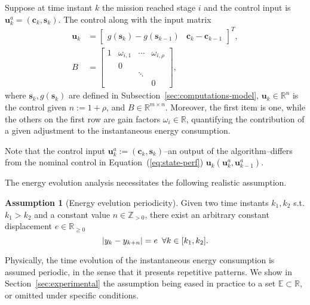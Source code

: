 \documentclass[letterpaper,10pt,conference]{ieeeconf}
\DeclarePairedDelimiter\abs{\lvert}{\rvert}%
\theoremstyle{definition}
\newtheorem{assm}[thm]{Assumption}
\begin{document}
Suppose at time instant $k$ the mission reached stage $i$ and the control input is $\mathbf{u}_k^a=(\mathbf{c}_k,\mathbf{s}_k)$. The control along with the input matrix
\begin{equation}\label{eq:state-control}\begin{split}  
  \mathbf{u}_k&=\begin{bmatrix}g(\mathbf{s}_k)-g(\mathbf{s}_{k-1}) & \mathbf{c}_k-\mathbf{c}_{k-1}\end{bmatrix}^T,\\
  B&=\left[\begin{array}{cccc}
    1& \omega_{i,1}& \cdots& \omega_{i,\rho}  \\
     &            0&       &  \\
     &             & \ddots&  \\
     &             &       & 0
  \end{array}\right],
\end{split}\end{equation}
where $\mathbf{s}_k,g(\mathbf{s}_k)$ are defined in Subsection~\ref{sec:computations-model}, $\mathbf{u}_k\in\mathbb{R}^n$ is the control given $n:=1+\rho$, and $B\in\mathbb{R}^{m\times n}$. Moreover, the first item is one, while the others on the first row are gain factors $\omega_{i}\in\mathbb{R}$, quantifying the contribution of a given adjustment to the instantaneous energy consumption. 

Note that the control input $\mathbf{u}_k^a:=(\mathbf{c}_{k},\mathbf{s}_{k})$--an output of the algorithm--differs from the nominal control in Equation~(\ref{eq:state-perf}) $\mathbf{u}_k(\mathbf{u}_k^a,\mathbf{u}_{k-1}^a)$.

The energy evolution analysis necessitates the following realistic assumption.
\begin{assm}[Energy evelution periodicity]\label{assm:periodic} 
Given two time instants $k_1,k_2$ s.t. $k_1>k_2$ and a constant value $n\in\mathbb{Z}_{> 0}$, there exist an arbitrary constant displacement $e\in\mathbb{R}_{\geq 0}$
\begin{equation}
  \abs{y_{k}-y_{k+n}}= e\,\,\,\forall k\in[k_1,k_2].
\end{equation}
\end{assm}

Physically, the time evolution of the instantaneous energy consumption is assumed periodic, in the sense that it presents repetitive patterns. We show in Section~\ref{sec:experimental} the assumption being eased in practice to a set $\mathbb{E}\subset\mathbb{R}$, or omitted under specific conditions.
\end{document}
